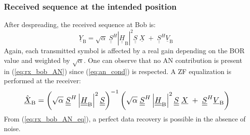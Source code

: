 \documentclass[a4paper,11pt]{article}
\begin{document}
\subsubsection{Received sequence at the intended position}
After despreading, the received sequence at Bob is: 
\begin{equation}
    \underline{Y}_{\text{B}} = \sqrt{\alpha} \; \underline{\underline{S}}^H \left|\underline{\underline{H}}_{\text{B}} \right|^2 \underline{\underline{S}}\; \underline{X} \;  +  \;  \underline{\underline{S}}^H \underline{V}_\text{B} 
    \label{eq:rx_bob_AN}
\end{equation}
Again, each transmitted symbol is affected by a real gain depending on the BOR value and weighted by $\sqrt{\alpha}$. One can observe that no AN contribution is present in (\ref{eq:rx_bob_AN}) since (\ref{eq:an_cond}) is respected. A ZF equalization is performed at the receiver:
\begin{equation}
 \resizebox{0.89\hsize}{!}{
    $\hat{\underline{X}}_{\text{B}} = \left( \sqrt{\alpha} \; \underline{\underline{S}}^H \left|\underline{\underline{H}}_{\text{B}} \right|^2 \underline{\underline{S}} \right)^{-1}  \left(\sqrt{\alpha} \; \underline{\underline{S}}^H \left|\underline{\underline{H}}_{\text{B}} \right|^2 \underline{\underline{S}}\; \underline{X} \;  +  \;  \underline{\underline{S}}^H \underline{V}_\text{B}\right)$} 
    \label{eq:rx_bob_AN_eq}
\end{equation}
From (\ref{eq:rx_bob_AN_eq}), a perfect data recovery is possible in the absence of noise.
\end{document}
